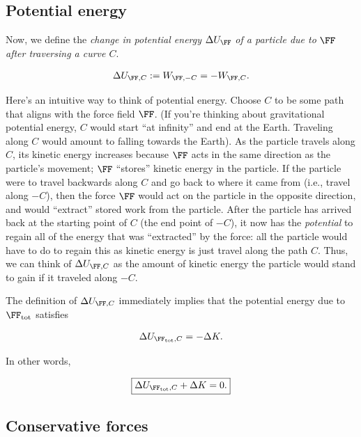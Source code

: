 \documentclass{article}
\begin{document}
\subsection*{Potential energy}

Now, we define the \textit{change in potential energy} $\Delta U_{\FF}$ \textit{of a particle due to} $\FF$ \textit{after traversing a curve $C$}. 

\begin{align*}
    \Delta U_{\FF, C} := W_{\FF, -C} = -W_{\FF, C}.
\end{align*}

Here's an intuitive way to think of potential energy. Choose $C$ to be some path that aligns with the force field $\FF$. (If you're thinking about gravitational potential energy, $C$ would start ``at infinity'' and end at the Earth. Traveling along $C$ would amount to falling towards the Earth). As the particle travels along $C$, its kinetic energy increases because $\FF$ acts in the same direction as the particle's movement; $\FF$ ``stores'' kinetic energy in the particle. If the particle were to travel backwards along $C$ and go back to where it came from (i.e., travel along $-C$), then the force $\FF$ would act on the particle in the opposite direction, and would ``extract'' stored work from the particle. After the particle has arrived back at the starting point of $C$ (the end point of $-C$), it now has the \textit{potential} to regain all of the energy that was ``extracted'' by the force: all the particle would have to do to regain this as kinetic energy is just travel along the path $C$. Thus, we can think of $\Delta U_{\FF, C}$ as the amount of kinetic energy the particle would stand to gain if it traveled along $-C$.

The definition of $\Delta U_{\FF, C}$ immediately implies that the potential energy due to $\FF_{\text{tot}}$ satisfies

\begin{align*}
    \Delta U_{\FF_{\text{tot}}, C} = -\Delta K.
\end{align*}

In other words,

\begin{align*}
    \boxed
    {
        \Delta U_{\FF_{\text{tot}}, C} + \Delta K = 0.
    }
\end{align*}

\subsection*{Conservative forces}
\end{document}
